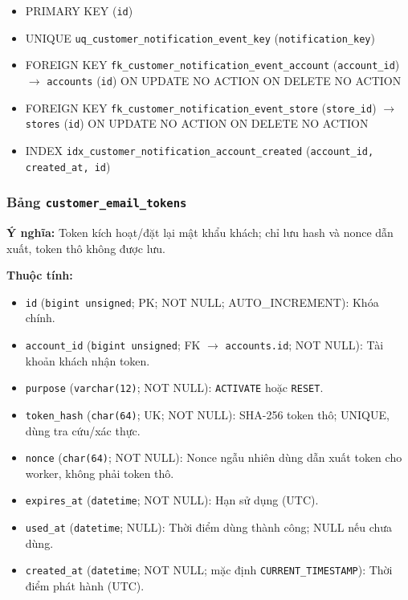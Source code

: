 \begin{itemize}

\item PRIMARY KEY (\texttt{id})

\item UNIQUE \texttt{uq\_customer\_notification\_event\_key} (\texttt{notification\_key})

\item FOREIGN KEY \texttt{fk\_customer\_notification\_event\_account} (\texttt{account\_id}) $\rightarrow$ \texttt{accounts} (\texttt{id}) ON UPDATE NO ACTION ON DELETE NO ACTION

\item FOREIGN KEY \texttt{fk\_customer\_notification\_event\_store} (\texttt{store\_id}) $\rightarrow$ \texttt{stores} (\texttt{id}) ON UPDATE NO ACTION ON DELETE NO ACTION

\item INDEX \texttt{idx\_customer\_notification\_account\_created} (\texttt{account\_id, created\_at, id})

\end{itemize}

\subsubsection{Bảng \texttt{customer\_email\_tokens}}

\textbf{Ý nghĩa:} Token kích hoạt/đặt lại mật khẩu khách; chỉ lưu hash và nonce dẫn xuất, token thô không được lưu.\par

\textbf{Thuộc tính:}

\begin{itemize}

\item \texttt{id} (\texttt{bigint unsigned}; PK; NOT NULL; AUTO_INCREMENT): Khóa chính.

\item \texttt{account\_id} (\texttt{bigint unsigned}; FK $\rightarrow$ \texttt{accounts.id}; NOT NULL): Tài khoản khách nhận token.

\item \texttt{purpose} (\texttt{varchar(12)}; NOT NULL): \texttt{ACTIVATE} hoặc \texttt{RESET}.

\item \texttt{token\_hash} (\texttt{char(64)}; UK; NOT NULL): SHA-256 token thô; UNIQUE, dùng tra cứu/xác thực.

\item \texttt{nonce} (\texttt{char(64)}; NOT NULL): Nonce ngẫu nhiên dùng dẫn xuất token cho worker, không phải token thô.

\item \texttt{expires\_at} (\texttt{datetime}; NOT NULL): Hạn sử dụng (UTC).

\item \texttt{used\_at} (\texttt{datetime}; NULL): Thời điểm dùng thành công; NULL nếu chưa dùng.

\item \texttt{created\_at} (\texttt{datetime}; NOT NULL; mặc định \texttt{CURRENT\_TIMESTAMP}): Thời điểm phát hành (UTC).

\end{itemize}

